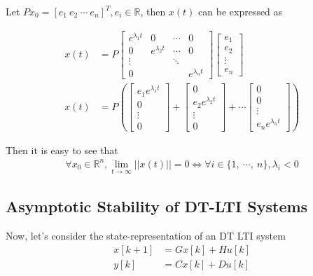 \documentclass[twoside]{article}
\begin{document}
Let $P x_0 = [e_1 \ e_2 \ \cdots \ e_n ]^T, e_i \in \mathbb{R}$, then 
$x(t)$ can be expressed as

\begin{align*}
x(t) &= P \left[ \begin{array}{cccc} e^{\lambda_1 t} & 0 & \cdots & 0 
\\
0 & e^{\lambda_2 t} &  \cdots & 0 
\\
\vdots &  &  \ddots &  
\\
0 &  &  &  e^{\lambda_n t}
\end{array} \right] 
\left[ \begin{array}{c} e_1 \\ e_2 \\ \vdots \\ e_n \end{array}
  \right] 
\\
x(t) &= P \left(
\left[ \begin{array}{c} e_1 e^{\lambda_1 t} \\ 0 \\ \vdots \\
         0 \end{array} \right]
+
\left[ \begin{array}{c} 0 \\ e_2 e^{\lambda_2 t} \\ \vdots \\
         0 \end{array} \right]
+ \cdots
\left[ \begin{array}{c} 0 \\ 0 \\ \vdots \\
         e_n e^{\lambda_n t}  \end{array} \right]
\right)
\end{align*}

Then it is easy to see that
\begin{align*}
    \forall x_0 \in \mathbb{R}^n, \lim_{t \to \infty} || x(t) || = 0
    \iff \forall i \in \lbrace 1 , \ \cdots ,  \ n \rbrace, \lambda_i < 0
\end{align*}

\subsection{Asymptotic Stability of DT-LTI Systems}

Now, let's consider the state-representation of an DT LTI system 
%
\begin{align*}
  x[k+1] &= G x[k] + H u[k]
\\
  y[k] &= C x[k] + D u[k]
\end{align*}
%
\end{document}
